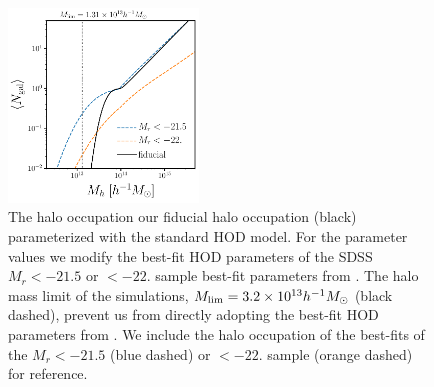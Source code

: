 \begin{figure}
\begin{center}
    \includegraphics[width=0.45\textwidth]{figs/hod_fid.pdf} 
    \caption{
        The halo occupation our fiducial halo occupation (black) parameterized with 
        the standard \cite{zheng2007} HOD model. For the parameter values we modify
        the best-fit HOD parameters of the SDSS $M_r < -21.5$ or $< -22.$ sample
        best-fit parameters from \cite{zheng2007}. The halo mass limit of the \quij 
        simulations,  $M_{\rm lim} = 3.2\times 10^{13} h^{-1}M_\odot$ (black dashed), 
        prevent us from directly adopting the best-fit HOD parameters from \cite{zheng2007}. 
        We include the halo occupation of the \cite{zheng2007} best-fits of the 
        $M_r < -21.5$ (blue dashed) or $< -22.$ sample (orange dashed) for reference.
    }\label{fig:hod}
\end{center}
\end{figure}

